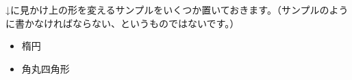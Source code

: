 ↓に見かけ上の形を変えるサンプルをいくつか置いておきます。（サンプルのように書かなければならない、というものではないです。）

\begin{itemize}
\item
  楕円

\begin{Shaded}
\begin{Highlighting}[]
    \NormalTok{: }\OperatorTok{;}
    \NormalTok{: }\OperatorTok{;}

    \NormalTok{: }\OperatorTok{;}

    \NormalTok{: }\DataTypeTok{\%}\OperatorTok{;}
\NormalTok{  \}}
\end{Highlighting}
\end{Shaded}
\end{itemize}

\begin{itemize}
\item
  角丸四角形

\begin{Shaded}
\begin{Highlighting}[]
    \NormalTok{: }\OperatorTok{;}
    \NormalTok{: }\OperatorTok{;}

    \NormalTok{: }\OperatorTok{;}

    \NormalTok{: }\OperatorTok{;}
\NormalTok{  \}}
\end{Highlighting}
\end{Shaded}
\end{itemize}

